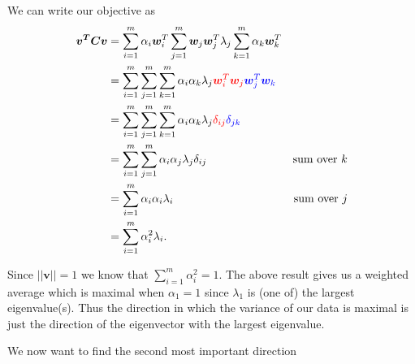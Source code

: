 We can write our objective as 
\begin{align}
    \bm{v^T} \bm{C v} &= \sum_{i=1}^m \alpha_i \bm{w}_i^T \sum_{j=1}^m \bm{w}_j\bm{w}_j^T \lambda_j \sum_{k=1}^m \alpha_k \bm{w}_k^T &\\
    &= \sum_{i=1}^m \sum_{j=1}^m \sum_{k=1}^m \alpha_{i} \alpha_{k} \lambda_{j} {\color{red} \bm{w}_i^T \bm{w}_j} {\color{blue} \bm{w}_j^T \bm{w}_k} &\\
    &= \sum_{i=1}^m \sum_{j=1}^m \sum_{k=1}^m \alpha_{i} \alpha_{k} \lambda_{j} {\color{red} \delta_{ij}} {\color{blue} \delta_{jk}}&\\
    &= \sum_{i=1}^m \sum_{j=1}^m  \alpha_{i} \alpha_{j} \lambda_{j} \delta_{ij} & \text{sum over $k$} \\ 
    &= \sum_{i=1}^m \alpha_{i} \alpha_{i} \lambda_{i}  & \text{sum over $j$} \\ 
    &= \sum_{i=1}^m \alpha_{i}^2 \lambda_{i}.
\end{align}

Since $||\bm{v}|| = 1$ we know that $\sum_{i=1}^m \alpha_i^2 = 1$. 
The above result gives us a weighted average which is maximal when $\alpha_1=1$ since $\lambda_1$ is (one of) the largest eigenvalue(s).
Thus the direction in which the variance of our data is maximal is just the direction of the eigenvector with the largest eigenvalue.

We now want to find the second most important direction 









